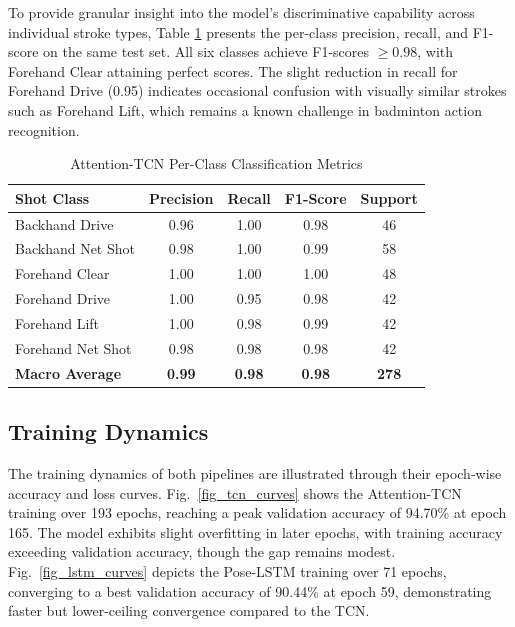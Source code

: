\documentclass[pdflatex,sn-mathphys-num]{sn-jnl}%
\theoremstyle{thmstyleone}%
\theoremstyle{thmstyletwo}%
\theoremstyle{thmstylethree}%
\begin{document}
To provide granular insight into the model's discriminative capability across individual stroke types, Table \ref{tab_perclass} presents the per-class precision, recall, and F1-score on the same test set. All six classes achieve F1-scores $\ge 0.98$, with Forehand Clear attaining perfect scores. The slight reduction in recall for Forehand Drive (0.95) indicates occasional confusion with visually similar strokes such as Forehand Lift, which remains a known challenge in badminton action recognition.

\begin{table}[h]
\caption{Attention-TCN Per-Class Classification Metrics}\label{tab_perclass}
\centering
\setlength{\tabcolsep}{5pt}
\renewcommand{\arraystretch}{1.3}
\begin{tabular}{|l|c|c|c|c|}
\hline
\textbf{Shot Class} & \textbf{Precision} & \textbf{Recall} & \textbf{F1-Score} & \textbf{Support} \\
\hline
Backhand Drive & 0.96 & 1.00 & 0.98 & 46 \\
\hline
Backhand Net Shot & 0.98 & 1.00 & 0.99 & 58 \\
\hline
Forehand Clear & 1.00 & 1.00 & 1.00 & 48 \\
\hline
Forehand Drive & 1.00 & 0.95 & 0.98 & 42 \\
\hline
Forehand Lift & 1.00 & 0.98 & 0.99 & 42 \\
\hline
Forehand Net Shot & 0.98 & 0.98 & 0.98 & 42 \\
\hline
\textbf{Macro Average} & \textbf{0.99} & \textbf{0.98} & \textbf{0.98} & \textbf{278} \\
\hline
\end{tabular}
\end{table}

\subsection{Training Dynamics}
The training dynamics of both pipelines are illustrated through their epoch-wise accuracy and loss curves. Fig.~\ref{fig_tcn_curves} shows the Attention-TCN training over 193 epochs, reaching a peak validation accuracy of 94.70\% at epoch 165. The model exhibits slight overfitting in later epochs, with training accuracy exceeding validation accuracy, though the gap remains modest. Fig.~\ref{fig_lstm_curves} depicts the Pose-LSTM training over 71 epochs, converging to a best validation accuracy of 90.44\% at epoch 59, demonstrating faster but lower-ceiling convergence compared to the TCN.
\end{document}
